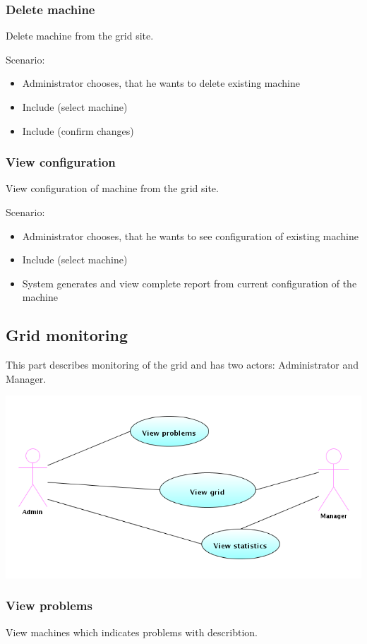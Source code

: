 \documentclass[12pt]{article}
\begin{document}
\subsubsection{Delete machine}
Delete machine from the grid site.

Scenario:
\begin{itemize}
\item{Administrator chooses, that he wants to delete existing machine}
\item{Include (select machine)}
\item{Include (confirm changes)}
\end{itemize}

\subsubsection{View configuration}
View configuration of machine from the grid site.

Scenario:
\begin{itemize}
\item{Administrator chooses, that he wants to see configuration of existing machine}
\item{Include (select machine)}
\item{System generates and view complete report from current configuration of the machine}
\end{itemize}

\subsection{Grid monitoring}
This part describes monitoring of the grid and has two actors: Administrator and Manager.

\includegraphics[width=\linewidth]{grid_monitoring.png}

\subsubsection{View problems}
View machines which indicates problems with describtion.
\end{document}

